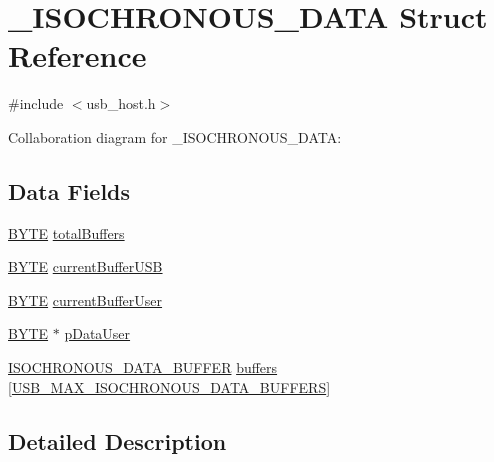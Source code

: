 \hypertarget{struct___i_s_o_c_h_r_o_n_o_u_s___d_a_t_a}{}\section{\+\_\+\+I\+S\+O\+C\+H\+R\+O\+N\+O\+U\+S\+\_\+\+D\+A\+T\+A Struct Reference}
\label{struct___i_s_o_c_h_r_o_n_o_u_s___d_a_t_a}


{\ttfamily \#include $<$usb\+\_\+host.\+h$>$}



Collaboration diagram for \+\_\+\+I\+S\+O\+C\+H\+R\+O\+N\+O\+U\+S\+\_\+\+D\+A\+T\+A\+:
\subsection*{Data Fields}
\begin{DoxyCompactItemize}
\item 
\hyperlink{_generic_type_defs_8h_a4ae1dab0fb4b072a66584546209e7d58}{B\+Y\+T\+E} \hyperlink{struct___i_s_o_c_h_r_o_n_o_u_s___d_a_t_a_ab474d2e9b1275ded10e8c5f45e856fdc}{total\+Buffers}
\item 
\hyperlink{_generic_type_defs_8h_a4ae1dab0fb4b072a66584546209e7d58}{B\+Y\+T\+E} \hyperlink{struct___i_s_o_c_h_r_o_n_o_u_s___d_a_t_a_ae16eb06224c11b916d70cb1577b685bc}{current\+Buffer\+U\+S\+B}
\item 
\hyperlink{_generic_type_defs_8h_a4ae1dab0fb4b072a66584546209e7d58}{B\+Y\+T\+E} \hyperlink{struct___i_s_o_c_h_r_o_n_o_u_s___d_a_t_a_ad258467ab8b17ad8fc19a302634e557d}{current\+Buffer\+User}
\item 
\hyperlink{_generic_type_defs_8h_a4ae1dab0fb4b072a66584546209e7d58}{B\+Y\+T\+E} $\ast$ \hyperlink{struct___i_s_o_c_h_r_o_n_o_u_s___d_a_t_a_a09efb3681b1904bc67b29f57b3c2b710}{p\+Data\+User}
\item 
\hyperlink{usb__host_8h_aed18deec2211c21ed01fd5a641366c16}{I\+S\+O\+C\+H\+R\+O\+N\+O\+U\+S\+\_\+\+D\+A\+T\+A\+\_\+\+B\+U\+F\+F\+E\+R} \hyperlink{struct___i_s_o_c_h_r_o_n_o_u_s___d_a_t_a_a7216cb57a0d1b33273f4778b81b89231}{buffers} \mbox{[}\hyperlink{usb__host_8h_ae55a12e2aba5290a69a1e4efc23d5915}{U\+S\+B\+\_\+\+M\+A\+X\+\_\+\+I\+S\+O\+C\+H\+R\+O\+N\+O\+U\+S\+\_\+\+D\+A\+T\+A\+\_\+\+B\+U\+F\+F\+E\+R\+S}\mbox{]}
\end{DoxyCompactItemize}


\subsection{Detailed Description}


